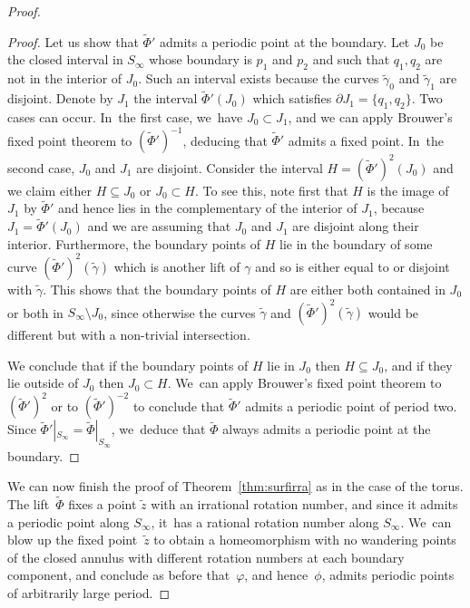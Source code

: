 \documentclass[10pt]{amsart}
\theoremstyle{definition}
\begin{document}
\begin{proof}
\begin{proof}
Let us show that $\widetilde \Phi'$ admits a periodic point at the boundary. Let $J_0$ be the closed interval in $S_\infty$ whose boundary is $p_1$ and $p_2$ and such that $q_1,q_2$ are not in the interior of $J_0$. Such an interval exists because the curves $\widetilde \gamma_0$ and $\widetilde \gamma_1$ are disjoint. Denote by $J_1$ the interval $\widetilde \Phi'(J_0)$ which satisfies $\partial J_1=\{q_1,q_2\}$. Two cases can occur. In~the first case, we~have $J_0\subset J_1$, and we can apply Brouwer's fixed point theorem to $(\widetilde \Phi')^{-1}$, deducing that $\widetilde \Phi'$ admits a fixed point. In~the second case, $J_0$ and $J_1$ are disjoint. Consider the interval $H=(\widetilde \Phi')^2(J_0)$ and we claim either $H\subseteq J_0$ or $J_0\subset H$. To see this, note first that $H$ is the image of $J_1$ by $\widetilde \Phi'$ and hence lies in the complementary of the interior of $J_1$, because $J_1=\widetilde \Phi'(J_0)$ and we are assuming that $J_0$ and $J_1$ are disjoint along their interior. Furthermore, the boundary points of $H$ lie in the boundary of some curve $(\widetilde \Phi')^2(\widetilde \gamma)$ which is another lift of $\gamma$ and so is either equal to or disjoint with $\widetilde \gamma$. This shows that the boundary points of $H$ are either both contained in $J_0$ or both in $S_\infty\setminus J_0$, since otherwise the curves $\widetilde \gamma$ and $(\widetilde \Phi')^2(\widetilde \gamma)$ would be different but with a non-trivial intersection.

We conclude that if the boundary points of $H$ lie in $J_0$ then $H\subseteq J_0$, and if they lie outside of $J_0$ then $J_0\subset H$. We~can apply Brouwer's fixed point theorem to $(\widetilde \Phi')^2$ or to $(\widetilde \Phi')^{-2}$ to conclude that $\widetilde \Phi'$ admits a periodic point of period two. Since $\widetilde \Phi'|_{S_\infty}=\widetilde \Phi|_{S_\infty}$, we~deduce that $\widetilde\Phi $ always admits a periodic point at the boundary.
\end{proof}

We can now finish the proof of Theorem~\ref{thm:surfirra} as in the case of the torus. The lift~$\widetilde \Phi$ fixes a point $\widetilde z$ with an irrational rotation number, and since it admits a periodic point along $S_{\infty}$, it~has a rational rotation number along $S_\infty$. We~can blow up the fixed point~$\widetilde{z}$ to obtain a homeomorphism with no wandering points of the closed annulus with different rotation numbers at each boundary component, and conclude as before that~$\varphi$, and hence~$\phi$, admits periodic points of arbitrarily large period.
\end{proof}
\end{document}
